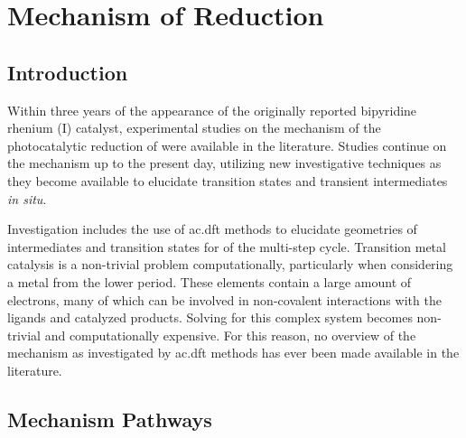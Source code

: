 \chapter{Mechanism of \texorpdfstring{}{CO2} Reduction}\label{chap.mech}

\section{Introduction}

Within three years of the appearance of the originally reported bipyridine rhenium (I) catalyst, experimental studies on the mechanism of the photocatalytic reduction of  were available in the literature\autocite{hawecker1986}. Studies continue on the mechanism up to the present day\autocite{johnson1996, koike2002, takeda2008, smieja2012, machan2014, kou2014}, utilizing new investigative techniques as they become available to elucidate transition states and transient intermediates \textit{in situ}. 

Investigation includes the use of \gls{ac.dft} methods to elucidate geometries of intermediates and transition states for of the multi-step cycle. Transition metal catalysis is a non-trivial problem computationally, particularly when considering a metal from the lower period. These elements contain a large amount of electrons, many of which can be involved in non-covalent interactions with the ligands and catalyzed products. Solving for this complex system becomes non-trivial and computationally expensive. For this reason, no overview of the mechanism as investigated by \gls{ac.dft} methods has ever been made available in the literature. 

\section{Mechanism Pathways}


